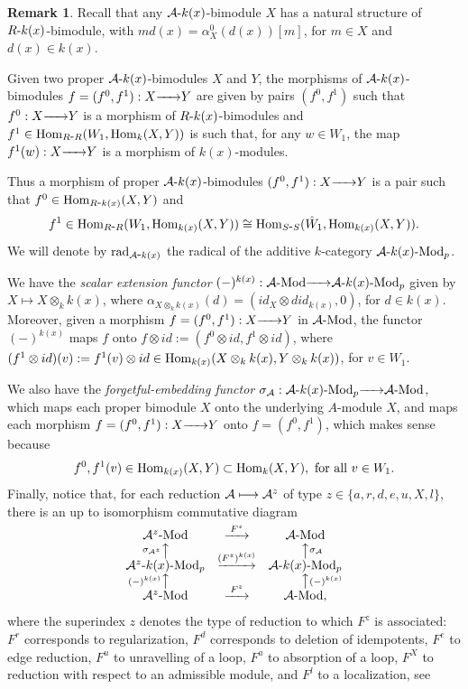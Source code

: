 \documentclass{article}
\theoremstyle{definition}
\newtheorem{remark}[theorem]{Remark}
\newcommand{\Hom}{{ \rm Hom }}
\newcommand{\Mod}{{ \rm Mod }}
\newcommand{\rad}{{ \rm rad }}
\newcommand{\g}{\hbox{-}}
\newcommand{\rightmap}[1]{\smash{\mathop{\hbox to 
20pt{\rightarrowfill}}\limits^{#1}}}
\newcommand{\shortlmapup}[1]
{\llap{$\vcenter{\hbox{$\scriptstyle#1$}}$}\big\uparrow}
\newcommand{\shortrmapup}[1]
{\big\uparrow\rlap{$\vcenter{\hbox{$\scriptstyle#1$}}$}}
\begin{document}
 \begin{remark}\label{R: morfismos de cal(A)-k(x)-bimods}
 Recall that any ${\cal A}\g k(x)$-bimodule $X$ has a natural structure of $R\g k(x)$-bimodule, with $md(x)=\alpha^0_X(d(x))[m]$, for $m\in X$ and $d(x)\in k(x)$.   
 
 Given two proper ${\cal A}\g k(x)$-bimodules $X$ and $Y$, the morphisms of ${\cal A}\g k(x)$-bimodules $f=(f^0,f^1):X\rightmap{}Y$ are given by pairs $(f^0,f^1)$ such that $f^0:X\rightmap{}Y$ is a morphism of $R\g k(x)$-bimodules and $f^1\in \Hom_{R\g R}(W_1,\Hom_k(X,Y))$ is such that, for any $w\in W_1$, the map $f^1(w):X\rightmap{}Y$ is a morphism of $k(x)$-modules. 
 
 Thus a morphism of proper ${\cal A}\g k(x)$-bimodules 
 $(f^0,f^1):X\rightmap{}Y$ is a pair such that $f^0\in \Hom_{R\g k(x)}(X,Y)$ and 
 $$f^1\in \Hom_{R\g R}(W_1,\Hom_{k(x)}(X,Y))\cong \Hom_{S\g S}(\hat{W}_1,\Hom_{k(x)}(X,Y)).$$
 We will denote by $\rad_{{\cal A}\g k(x)}$ the radical of the additive $k$-category ${\cal A}\g k(x)\g\Mod_p$.
 
 We have the \emph{scalar extension functor} $(-)^{k(x)}:{\cal A}\g\Mod\rightmap{}{\cal A}\g k(x)\g\Mod_p$ given by $X\longmapsto X\otimes_kk(x)$, where $\alpha_{X\otimes_kk(x)}(d)=(id_X\otimes did_{k(x)},0)$, for $d\in k(x)$. Moreover, given a morphism $f=(f^0,f^1):X\rightmap{}Y$ in ${\cal A}\g\Mod$, the functor $(-)^{k(x)}$ maps $f$ onto $f\otimes id:=(f^0\otimes id,f^1\otimes id)$, where $(f^1\otimes id)(v):=f^1(v)\otimes id\in \Hom_{k(x)}(X\otimes_k k(x),Y\otimes_k k(x))$, for $v\in W_1$. 
 
 We also have the \emph{forgetful-embedding functor}  
 $\sigma_{\cal A}:{\cal A}\g k(x)\g\Mod_p\rightmap{}{\cal A}\g\Mod$, which maps each proper bimodule $X$ onto the underlying $A$-module $X$, and maps each morphism $f=(f^0,f^1):X\rightmap{}Y$ onto $f=(f^0,f^1)$, which makes sense  because 
 $$f^0,f^1(v)\in \Hom_{k(x)}(X,Y)\subset \Hom_k(X,Y), \hbox{ for all } v\in W_1.$$ 
 Finally, notice that, for each reduction ${\cal A}\longmapsto {\cal A}^z$ of type $z\in \{a,r,d,e,u,X,l\}$, 
 there is an up to isomorphism  commutative diagram
$$\begin{matrix}
{\cal A}^z\g\Mod&\rightmap{F^z}&{\cal A}\g\Mod\\
\shortlmapup{\sigma_{{\cal A}^z}}&&\shortrmapup{\sigma_{\cal A}}\\
{\cal A}^z\g k(x)\g\Mod_p&\rightmap{(F^z)^{k(x)}}&{\cal A}\g k(x)\g\Mod_p\\
\shortlmapup{(-)^{k(x)}}&&\shortrmapup{(-)^{k(x)}}\\
{\cal A}^z\g\Mod&\rightmap{F^z}&{\cal A}\g\Mod,\\
\end{matrix}$$
 where the superindex $z$ denotes the type of reduction to which $F^{z}$ is associated:  $F^r$ corresponds to regularization, $F^d$ corresponds to deletion of idempotents,  $F^e$ to edge reduction, $F^u$ to unravelling of a loop, $F^a$ to absorption of a loop, $F^X$ to reduction with respect to an admissible module, and $F^l$ to a localization, see \cite[\S25]{BSZ}  
\end{remark}  
 
\end{document}
